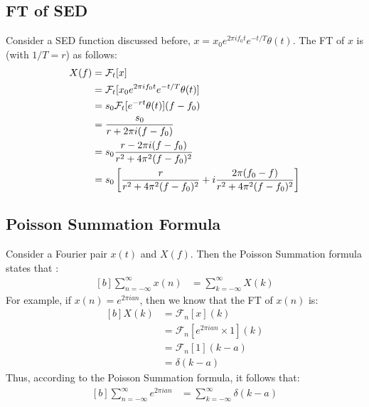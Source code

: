 \documentclass[letterpaper, 11pt]{article}
\newcommand{\sed}[2]{#2_{0}e^{2\pi if_{0}#1}e^{-#1/T} \theta (#1)} %
\newcommand{\fsum}[1]{\sum_{#1 = -\infty}^{\infty}} %
\newcommand{\fourier}[2]{\mathcal{F}_{#1}[#2]} %
\numberwithin{equation}{section}
\numberwithin{figure}{section}
\numberwithin{table}{section}
\begin{document}
\subsection{FT of SED}
Consider a SED function discussed before, \(x = \sed{t}{x}\). The FT of \(x\) is (with \(1/T = r\)) as follows:
\begin{equation}
	\begin{aligned}[b]
		X(f)	&= \fourier{t}{x}\\
			&= \fourier{t}{\sed{t}{x}}\\
			&= s_{0}\fourier{t}{e^{-rt} \theta (t)}(f - f_{0})\\
			&= \frac{s_{0}}{r + 2\pi i(f - f_{0})} \\
			\gdef\temp{r^2 + 4\pi^{2}(f - f_{0})^2} %
			&= s_{0}\frac{r - 2\pi i(f - f_{0})}{\temp}\\
			&= s_{0}\left[\frac{r}{\temp} + i\frac{2\pi(f_{0} - f)}{\temp} \right]
	\end{aligned}
\end{equation}

\subsection{Poisson Summation Formula}
Consider a Fourier pair \(x(t)\) and \(X(f)\). Then the Poisson Summation formula states that \cite{stein}:
\begin{equation}
	\begin{aligned}[b]
		\fsum{n} x(n)	&= \fsum{k} X(k)
	\end{aligned}
\end{equation}
For example, if \(x(n) = e^{2 \pi ian}\), then we know that the FT of \(x(n)\) is:
\begin{equation}
	\begin{aligned}[b]
		X(k)	&= \fourier{n}{x}(k) \\
			&= \fourier{n}{e^{2 \pi ian} \times 1}(k) \\
			&= \fourier{n}{1}(k - a) \\
			&= \delta (k - a)
	\end{aligned}
\end{equation}
Thus, according to the Poisson Summation formula, it follows that:
\begin{equation}
	\begin{aligned}[b]
		\fsum{n} e^{2 \pi ian}
			&= \fsum{k} \delta (k - a)
			\label{eq:poisson}
	\end{aligned}
\end{equation}
\end{document}
